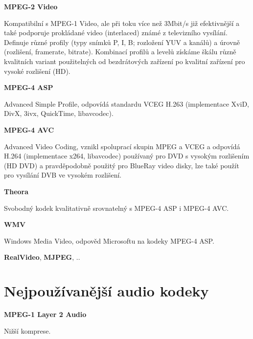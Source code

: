 \vspace{10pt}

\textbf{MPEG-2 Video}

Kompatibilní s MPEG-1 Video, ale při toku více než 3Mbit/s již efektivnější a také podporuje prokládané video (interlaced) známé z televizního vysílání. Definuje různé profily (typy snímků P, I, B; rozložení YUV a kanálů) a úrovně (rozlišení, framerate, bitrate). Kombinací profilů a levelů získáme škálu různě kvalitních variant použitelných od bezdrátových zařízení po kvalitní zařízení pro vysoké rozlišení (HD).

\vspace{10pt}

\textbf{MPEG-4 ASP}

Advanced Simple Profile, odpovídá standardu VCEG H.263 (implementace XviD, DivX, 3ivx, QuickTime, libavcodec).

\vspace{10pt}

\textbf{MPEG-4 AVC}

Advanced Video Coding, vznikl spoluprací skupin MPEG a VCEG a odpovídá H.264 (implementace x264, libavcodec) používaný pro DVD s vysokým rozlišením (HD DVD) a pravděpodobně použitý pro BlueRay video disky, lze také použít pro vysílání DVB ve vysokém rozlišení.

\vspace{10pt}

\textbf{Theora}

Svobodný kodek kvalitativně srovnatelný s MPEG-4 ASP i MPEG-4 AVC.

\vspace{10pt}

\textbf{WMV}

Windows Media Video, odpověd Microsoftu na kodeky MPEG-4 ASP.

\vspace{10pt}

\textbf{RealVideo}, \textbf{MJPEG}, ..

\vspace{10pt}

\section{Nejpoužívanější audio kodeky}

\vspace{10pt}

\textbf{MPEG-1 Layer 2 Audio}

Nižší komprese.

